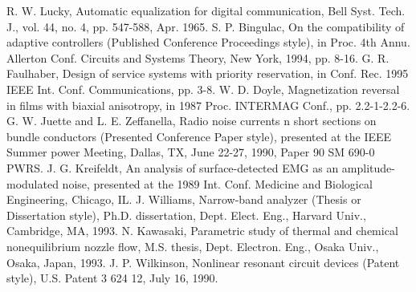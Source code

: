  R. W. Lucky, Automatic equalization for digital communication, Bell Syst. Tech. J., vol. 44, no. 4, pp. 547-588, Apr. 1965.
 S. P. Bingulac, On the compatibility of adaptive controllers (Published Conference Proceedings style), in Proc. 4th Annu. Allerton Conf. Circuits and Systems Theory, New York, 1994, pp. 8-16.
 G. R. Faulhaber, Design of service systems with priority reservation, in Conf. Rec. 1995 IEEE Int. Conf. Communications, pp. 3-8.
 W. D. Doyle, Magnetization reversal in films with biaxial anisotropy, in 1987 Proc. INTERMAG Conf., pp. 2.2-1-2.2-6.
 G. W. Juette and L. E. Zeffanella, Radio noise currents n short sections on bundle conductors (Presented Conference Paper style), presented at the IEEE Summer power Meeting, Dallas, TX, June 22-27, 1990, Paper 90 SM 690-0 PWRS.
 J. G. Kreifeldt, An analysis of surface-detected EMG as an amplitude-modulated noise, presented at the 1989 Int. Conf. Medicine and Biological Engineering, Chicago, IL.
 J. Williams, Narrow-band analyzer (Thesis or Dissertation style), Ph.D. dissertation, Dept. Elect. Eng., Harvard Univ., Cambridge, MA, 1993. 
 N. Kawasaki, Parametric study of thermal and chemical nonequilibrium nozzle flow, M.S. thesis, Dept. Electron. Eng., Osaka Univ., Osaka, Japan, 1993.
 J. P. Wilkinson, Nonlinear resonant circuit devices (Patent style), U.S. Patent 3 624 12, July 16, 1990. 
